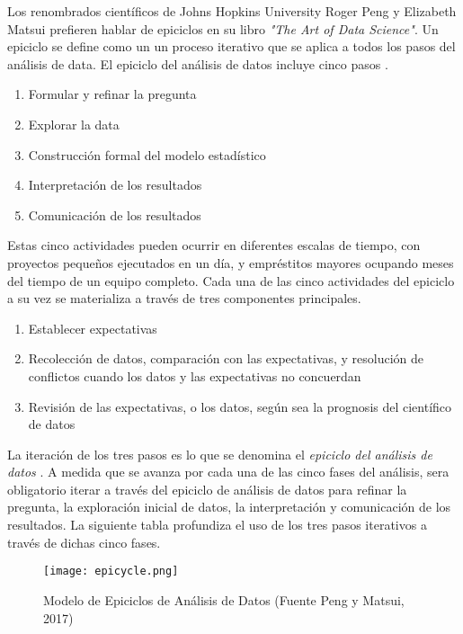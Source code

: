 Los renombrados científicos de Johns Hopkins University Roger Peng y Elizabeth Matsui prefieren hablar de epiciclos en su libro \emph{"The Art of Data Science"}. Un epiciclo se define como un un proceso iterativo que se aplica a todos los pasos del análisis de data. El epiciclo del análisis de datos incluye cinco pasos \cite{pengMatsui}.

\begin{enumerate}
	\item Formular y refinar la pregunta
	\item Explorar la data
	\item Construcción formal del modelo estadístico
	\item Interpretación de los resultados
	\item Comunicación de los resultados
\end{enumerate}

Estas cinco actividades pueden ocurrir en diferentes escalas de tiempo, con proyectos pequeños ejecutados en un día, y empréstitos mayores ocupando meses del tiempo de un equipo completo. Cada una de las cinco actividades del epiciclo a su vez se materializa a través de tres componentes principales.

\begin{enumerate}
	\item Establecer expectativas
	\item Recolección de datos, comparación con las expectativas, y resolución de conflictos cuando los datos y las expectativas no concuerdan
	\item Revisión de las expectativas, o los datos, según sea la prognosis del científico de datos
\end{enumerate}

La iteración de los tres pasos es lo que se denomina el \emph{epiciclo del análisis de datos} \cite{pengMatsui}. A medida que se avanza por cada una de las cinco fases del análisis, sera obligatorio iterar a través del epiciclo de análisis de datos para refinar la pregunta, la exploración inicial de datos, la interpretación y comunicación de los resultados. La siguiente tabla profundiza el uso de los tres pasos iterativos a través de dichas cinco fases. 

\begin{figure}[h!]
	\centering
	\texttt{[image: epicycle.png]}
	\caption{Modelo de Epiciclos de Análisis de Datos (Fuente Peng y Matsui, 2017)}
\end{figure}


